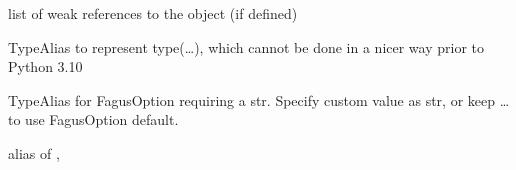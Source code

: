 \documentclass[a4paper,10pt,english]{sphinxmanual}
\begin{document}
\begin{fulllineitems}

\begin{fulllineitems}
\label{\detokenize{fagus.utils:fagus.utils.FagusOption.__module__}}
\pysigstartsignatures
{}
\pysigstopsignatures
\end{fulllineitems}


\begin{fulllineitems}
\label{\detokenize{fagus.utils:fagus.utils.FagusOption.__weakref__}}
\pysigstartsignatures
{}
\pysigstopsignatures
\sphinxAtStartPar
list of weak references to the object (if defined)

\end{fulllineitems}


\end{fulllineitems}


\begin{fulllineitems}
\label{\detokenize{fagus.utils:fagus.utils.EllipsisType}}
\pysigstartsignatures
{}
\pysigstopsignatures
\sphinxAtStartPar
TypeAlias to represent type(…), which cannot be done in a nicer way prior to Python 3.10

\end{fulllineitems}


\begin{fulllineitems}
\label{\detokenize{fagus.utils:fagus.utils.OptStr}}
\pysigstartsignatures
{}
\pysigstopsignatures
\sphinxAtStartPar
TypeAlias for FagusOption requiring a str. Specify custom value as str, or keep … to use FagusOption default.

\sphinxAtStartPar
alias of \sphinxcode{\sphinxupquote{Union}}{[}, \sphinxcode{\sphinxupquote{ellipsis}}{]}

\end{fulllineitems}
\end{document}
